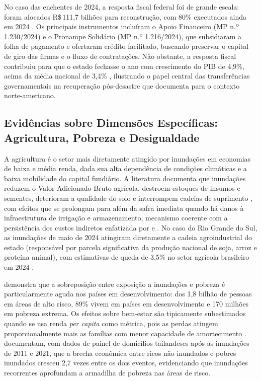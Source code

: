 \documentclass[a4paper,12pt]{article}
\begin{document}
No caso das enchentes de 2024, a resposta fiscal federal foi de grande escala: foram
alocados R\$\,111,7 bilhões para reconstrução, com 80\% executados ainda em 2024
\cite{ocha2024}. Os principais instrumentos incluíram o Apoio Financeiro
(MP n.º 1.230/2024) e o Pronampe Solidário (MP n.º 1.216/2024), que subsidiaram a folha
de pagamento e ofertaram crédito facilitado, buscando preservar o capital de giro das
firmas e o fluxo de contratações. Não obstante, a resposta fiscal contribuiu para que o
estado fechasse o ano com crescimento do PIB de 4,9\%, acima da média nacional de
3,4\% \cite{ocha2024}, ilustrando o papel central das transferências governamentais na
recuperação pós-desastre que  documenta para o contexto
norte-americano.

\subsection{Evidências sobre Dimensões Específicas: Agricultura, Pobreza e
Desigualdade}
\label{sub:agricultura}

A agricultura é o setor mais diretamente atingido por inundações em economias de baixa e
média renda, dada sua alta dependência de condições climáticas e a baixa mobilidade do
capital fundiário.
A literatura documenta que inundações reduzem o Valor Adicionado
Bruto agrícola, destroem estoques de insumos e sementes, deterioram a qualidade do solo
e interrompem cadeias de suprimento \cite{leiter2009, bergholt2012}, com efeitos que se
prolongam para além da safra imediata quando há danos à infraestrutura de irrigação e
armazenamento, mecanismo coerente com a persistência dos custos indiretos enfatizada
por  e .
No caso do Rio Grande do Sul, as inundações de maio de 2024 atingiram diretamente a
cadeia agroindustrial do estado (responsável por parcela significativa da produção
nacional de soja, arroz e proteína animal), com estimativas de queda de 3,5\% no setor
agrícola brasileiro em 2024 \cite{ocha2024}.

 demonstra que a sobreposição entre exposição a inundações e
pobreza é particularmente aguda nos países em desenvolvimento: dos 1,8 bilhão de
pessoas em áreas de alto risco, 89\% vivem em países em desenvolvimento e 170 milhões
em pobreza extrema. Os efeitos sobre bem-estar são tipicamente subestimados quando se
usa renda \textit{per capita} como métrica, pois as perdas atingem proporcionalmente mais
as famílias com menor capacidade de amortecimento \cite{rentschler2022}.
 documentam,
com dados de painel de domicílios tailandeses após as inundações de 2011 e 2021, que a
brecha econômica entre ricos não inundados e pobres inundados cresceu 2,7 vezes entre os
dois eventos, evidenciando que inundações recorrentes aprofundam a armadilha de pobreza
nas áreas de risco.
\end{document}
